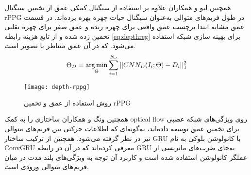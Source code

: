    همچنین لیو و همکاران
\cite{liu2018learning}
   علاوه بر استفاده از سیگنال کمکی عمق از تخمین سیگنال rPPG در طول فریم‌های متوالی به‌عنوان سیگنال حیات چهره بهره برده‌اند. در قسمت عمق مشابه
\cite{atoum2017face}
   ابتدا برچسب عمق واقعی برای چهره زنده و عمق صفر برای چهره تقلبی تخمین زده شده و از تابع هزینه رابطه
\ref{eq:depthreg}
   برای بهینه سازی شبکه استفاده می‌شود. که در آن  عمق متناظر با تصویر  است.
\begin{equation}\label{eq:depthreg}
	\Theta_D = \operatorname*{arg\,min}_\Theta{\sum_{i=1}^{N_d}||CNN_D(I_i;\Theta)-D_i||^2_1} 
\end{equation}

\begin{figure}[t]
	\centerline{\texttt{[image: depth-rppg]}}
	\caption{روش استفاده از عمق و تخمین rPPG \cite{liu2018learning}}
	\label{fig:depth-rppg}
\end{figure}

همچنین ونگ و همکاران
\cite{wang2018exploiting}
ساختاری را به کمک optical flow روی ویژگی‌های شبکه عصبی برای تخمین عمق توسعه داده‌اند، به‌گونه‌ای که اطلاعات حرکتی بین فریم‌های متوالی نیز در نظر گرفته می‌شود. همچنین از ترکیب ساختار
 GRU \cite{cho2014learning}
با کانولوشن بلوکی به نام ConvGRU معرفی کرده‌اند که در آن در رابطه GRU به‌جای ضرب‌های ماتریسی از عملگر کانولوشن استفاده شده است و کاربرد آن توجه به ویژگی‌های بلند مدت در میان فریم‌های متوالی ورودی است.

